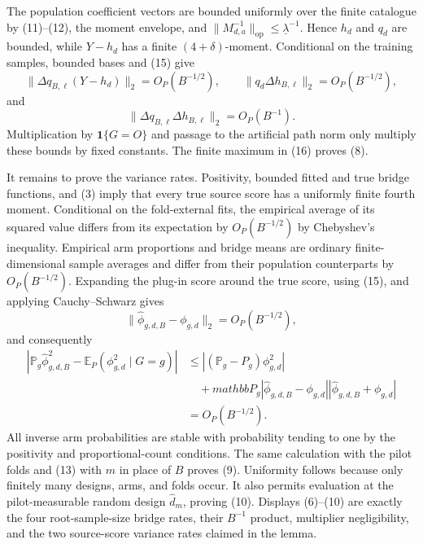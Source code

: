 The population coefficient vectors are bounded uniformly over the finite catalogue by (11)--(12), the moment envelope, and \(\|M_{d,a}^{-1}\|_{\mathrm{op}}\le\underline\lambda^{-1}\).  Hence \(h_d\) and \(q_d\) are bounded, while \(Y-h_d\) has a finite \((4+\delta)\)-moment.  Conditional on the training samples, bounded bases and (15) give
\[
 \|\Delta q_{B,\ell}(Y-h_d)\|_2=O_P(B^{-1/2}),
 \qquad
 \|q_d\Delta h_{B,\ell}\|_2=O_P(B^{-1/2}),
\]
and
\[
 \|\Delta q_{B,\ell}\Delta h_{B,\ell}\|_2=O_P(B^{-1}). \tag{16}
\]
Multiplication by \(\mathbf1\{G=O\}\) and passage to the artificial path norm only multiply these bounds by fixed constants.  The finite maximum in (16) proves (8).

It remains to prove the variance rates.  Positivity, bounded fitted and true bridge functions, and (3) imply that every true source score has a uniformly finite fourth moment.  Conditional on the fold-external fits, the empirical average of its squared value differs from its expectation by \(O_P(B^{-1/2})\) by Chebyshev's inequality.  Empirical arm proportions and bridge means are ordinary finite-dimensional sample averages and differ from their population counterparts by \(O_P(B^{-1/2})\).  Expanding the plug-in score around the true score, using (15), and applying Cauchy--Schwarz gives
\[
 \|\widehat\phi_{g,d,B}-\phi_{g,d}\|_2=O_P(B^{-1/2}),
\]
and consequently
\[
\begin{aligned}
 \left|\mathbb P_g\widehat\phi_{g,d,B}^2
       -\mathbb E_P(\phi_{g,d}^2\mid G=g)\right|
 &\le
 \left|(\mathbb P_g-P_g)\phi_{g,d}^2\right|\\
 &\quad+mathbb P_g|\widehat\phi_{g,d,B}-\phi_{g,d}|
                    |\widehat\phi_{g,d,B}+\phi_{g,d}|\\
 &=O_P(B^{-1/2}).                                         \tag{17}
\end{aligned}
\]
All inverse arm probabilities are stable with probability tending to one by the positivity and proportional-count conditions.  The same calculation with the pilot folds and (13) with \(m\) in place of \(B\) proves (9).  Uniformity follows because only finitely many designs, arms, and folds occur.  It also permits evaluation at the pilot-measurable random design \(\widehat d_m\), proving (10).  Displays (6)--(10) are exactly the four root-sample-size bridge rates, their \(B^{-1}\) product, multiplier negligibility, and the two source-score variance rates claimed in the lemma.
